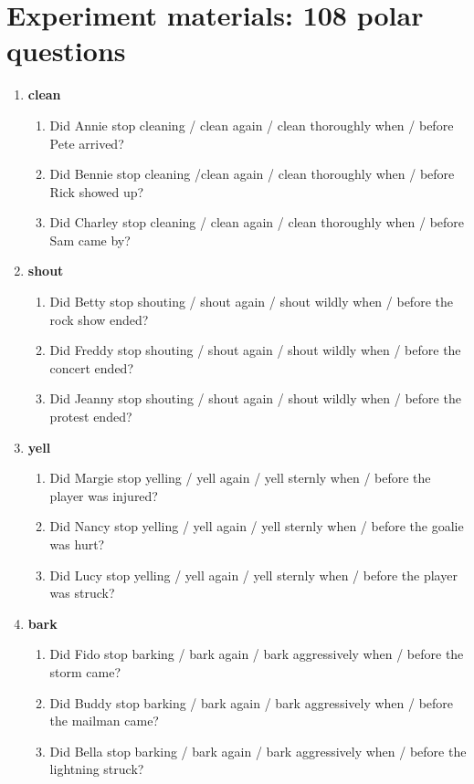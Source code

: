 \documentclass[a4paper,12pt]{article}
\newcommand{\6}{\mbox{$[\hspace*{-.6mm}[$}}
\newcommand{\9}{\mbox{$]\hspace*{-.6mm}]$}}
\begin{document}
\section{Experiment materials: 108 polar questions}\label{a-pqs}

\begin{enumerate}[leftmargin=3ex,itemsep=-4pt]

\item {\bf clean}

\begin{enumerate}[leftmargin=2ex,itemsep=-4pt]
\item Did Annie stop cleaning	/ clean again / clean thoroughly when / before Pete arrived?
\item Did Bennie stop cleaning /clean again / clean thoroughly when / before Rick showed up?
\item Did Charley stop cleaning / clean again / clean thoroughly	when / before Sam came by?
\end{enumerate}

\item {\bf shout}
\begin{enumerate}[leftmargin=2ex,itemsep=-4pt]
\item Did Betty stop shouting / shout again	/ shout wildly when / before the rock show ended?
\item Did Freddy stop shouting / shout again	/ shout wildly	when / before the concert ended?
\item Did Jeanny stop shouting	/ shout again / shout wildly	when / before the protest ended?
\end{enumerate}

\item {\bf yell}
\begin{enumerate}[leftmargin=2ex,itemsep=-4pt]
\item Did Margie stop yelling	/ yell again / yell sternly	when / before the player was injured?
\item Did Nancy stop yelling / yell again / yell sternly when /	before the goalie was hurt?
\item Did Lucy stop yelling	 / yell again / yell sternly when /	before the player was struck?
\end{enumerate}


\item {\bf bark}
\begin{enumerate}[leftmargin=2ex,itemsep=-4pt]

\item Did Fido stop barking	 / bark again / bark aggressively	when / before the storm came?
\item Did Buddy stop barking / bark again / bark aggressively when /	before the mailman came?
\item Did Bella stop barking / bark again / bark aggressively	when / before the lightning struck?
\end{enumerate}



\end{enumerate}
\end{document}
